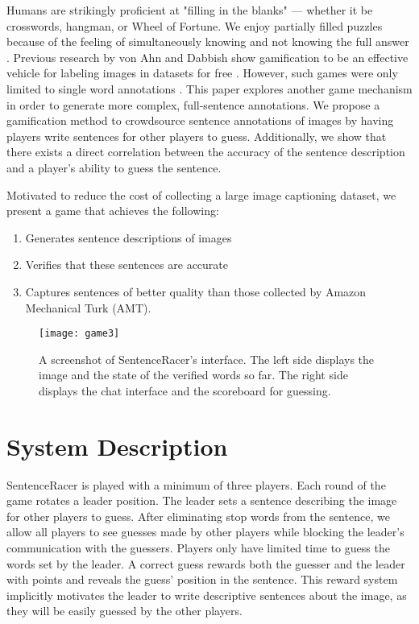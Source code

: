 \documentclass[preprint]{sigchi}
\begin{document}
Humans are strikingly proficient at "filling in the blanks" --- whether it be crosswords, hangman, or Wheel of Fortune. We enjoy partially filled puzzles because of the feeling of simultaneously knowing and not knowing the full answer \cite{crossword}. Previous research by von Ahn and Dabbish show gamification to be an effective vehicle for labeling images in datasets for free \cite{gwap1}. However, such games were only limited to single word annotations \cite{gwap1}. This paper explores another game mechanism in order to generate more complex, full-sentence annotations. We propose a gamification method to crowdsource sentence annotations of images by having players write sentences for other players to guess. Additionally, we show that there exists a direct correlation between the accuracy of the sentence description and a player's ability to guess the sentence.

Motivated to reduce the cost of collecting a large image captioning dataset, we present a game that achieves the following: \begin{enumerate}\item Generates sentence descriptions of images \item Verifies that these sentences are accurate \item Captures sentences of better quality than those collected by Amazon Mechanical Turk (AMT). \end{enumerate}
\begin{figure}[t]
\centering
\texttt{[image: game3]}
\caption{A screenshot of SentenceRacer's interface. The left side displays the image and the state of the verified words so far. The right side displays the chat interface and the scoreboard for guessing.} 
\label{fig-example2}
\end{figure}
\section{System Description}
SentenceRacer is played with a minimum of three players. Each round of the game rotates a leader position. The leader sets a sentence describing the image for other players to guess. After eliminating stop words from the sentence, we allow all players to see guesses made by other players while blocking the leader's communication with the guessers. Players only have limited time to guess the words set by the leader. A correct guess rewards both the guesser and the leader with points and reveals the guess' position in the sentence. This reward system implicitly motivates the leader to write descriptive sentences about the image, as they will be easily guessed by the other players.
\end{document}
